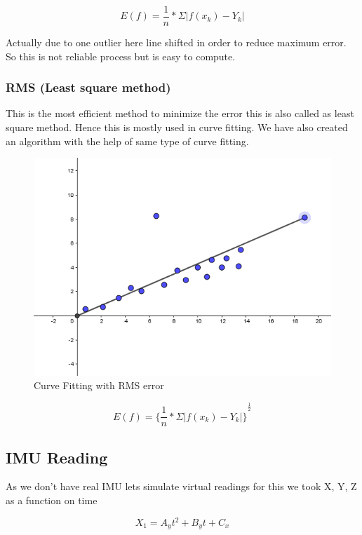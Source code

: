 \begin{equation}
E(f)=\frac{1}{n}*\Sigma|f(x_k)-Y_k| 
\end{equation}

Actually due to one outlier here line shifted in order to reduce maximum error. So this is not reliable process but is easy to compute.

\subsubsection{RMS (Least square method)}
This is the most efficient method to minimize the error this is also called as least square method.
Hence this is mostly used in curve fitting.
We have also created an algorithm with the help of same type of curve fitting.

\begin{figure}[!htb]
\includegraphics[width=\textwidth]{./figures/RMS.PNG}
\caption{Curve Fitting with RMS error }
\end{figure}

\begin{equation}
E(f)={\lbrace\frac{1}{n}*\Sigma|f(x_k)-Y_k|\rbrace}^\frac{1}{2} 
\end{equation}

\subsection{IMU Reading}
As we don’t have real IMU lets simulate virtual readings for this we took X, Y, Z as a function on time 

\begin{equation}
\label{For_x}
X_1=A_y t^2+B_y t +C_x
\end{equation}

